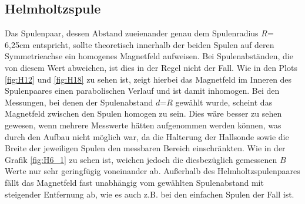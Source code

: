     \subsection{Helmholtzspule}
        Das Spulenpaar, dessen Abstand zueienander genau dem Spulenradius $R$= 6,25\si{\centi\meter} entspricht, sollte theoretisch innerhalb
        der beiden Spulen auf deren Symmetrieachse ein homogenes Magnetfeld aufweisen. Bei Spulenabständen, die von diesem Wert abweichen,
        ist dies in der Regel nicht der Fall. Wie in den Plots \ref{fig:H12} und \ref{fig:H18} zu sehen ist, zeigt hierbei das Magnetfeld
        im Inneren des Spulenpaares einen parabolischen Verlauf und ist damit inhomogen. 
        Bei den Messungen, bei denen der Spulenabstand $d$=$R$ gewählt wurde, scheint das Magnetfeld zwischen den Spulen homogen zu sein.
        Dies wäre besser zu sehen gewesen, wenn mehrere Messwerte hätten aufgenommen werden können, was durch den Aufbau nicht möglich war, 
        da die Halterung der Hallsonde sowie die Breite der jeweiligen Spulen den messbaren Bereich einschränkten. Wie in der Grafik \ref{fig:H6_1}
        zu sehen ist, weichen jedoch die diesbezüglich gemessenen $B$ Werte nur sehr geringfügig voneinander ab.
        Außerhalb des Helmholtzspulenpaares fällt das Magnetfeld fast unabhängig vom gewählten Spulenabstand mit steigender Entfernung ab, 
        wie es auch z.B. bei den einfachen Spulen der Fall ist.

